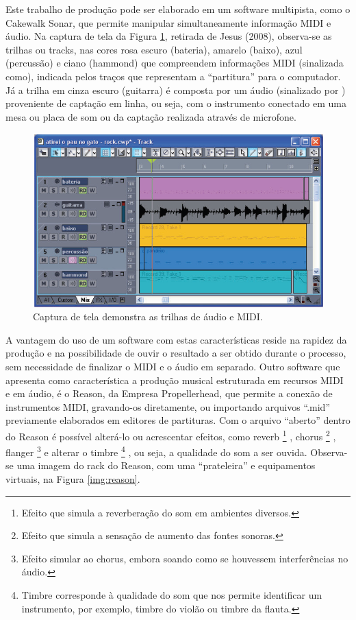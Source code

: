 Este trabalho de produção pode ser elaborado em um software multipista,
 como o Cakewalk Sonar, que permite manipular simultaneamente informação
 MIDI e áudio. Na captura de tela da Figura \ref{img:midi}, retirada de
 Jesus (2008), observa-se as trilhas ou tracks, nas cores rosa escuro
 (bateria), amarelo (baixo), azul (percussão) e ciano (hammond) que
 compreendem informações MIDI (sinalizada como), indicada pelos traços
 que representam a ``partitura'' para o computador. Já a trilha em cinza 
escuro (guitarra) é composta por um áudio (sinalizado por ) proveniente
 de captação em linha, ou seja, com o instrumento conectado em uma mesa
 ou placa de som ou da captação realizada através de microfone. 

\begin{figure}[!ht]
 \centering
 \includegraphics[scale=0.8]{musica_midi.png}
 \caption{Captura de tela demonstra as trilhas de áudio e MIDI. \cite{bib:musica_jesus}}
 \label{img:midi}
\end{figure}

A vantagem do uso de um software com estas características reside na
 rapidez da produção e na possibilidade de ouvir o resultado a ser 
obtido durante o processo, sem necessidade de finalizar o MIDI e o 
áudio em separado.
Outro software que apresenta como característica a produção musical
 estruturada em recursos MIDI e em áudio, é o Reason, da Empresa
 Propellerhead, que permite a conexão de instrumentos MIDI, gravando-os
 diretamente, ou importando arquivos ``.mid'' previamente elaborados em 
editores de partituras. Com o arquivo ``aberto'' dentro do Reason é
 possível alterá-lo ou acrescentar efeitos, como reverb
\footnote{Efeito que simula a reverberação do som em ambientes diversos.}
, chorus
\footnote{Efeito que simula a sensação de aumento das fontes sonoras.}
, flanger
\footnote{Efeito simular ao chorus, embora soando como se houvessem
 interferências no áudio.} 
e alterar o timbre
\footnote{Timbre corresponde à qualidade do som que nos permite
 identificar um instrumento, por exemplo, timbre do violão ou timbre 
da flauta.}
, ou seja, a qualidade do som a ser ouvida. Observa-se uma imagem do 
rack do Reason, com  uma ``prateleira'' e equipamentos virtuais, na 
Figura \ref{img:reason}.

